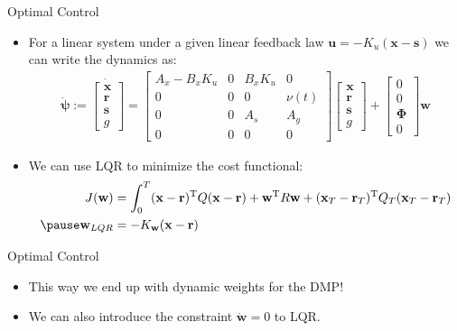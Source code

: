 \documentclass[handout]{beamer}
\newcommand{\fullvec}{\boldsymbol{\psi}} %
\newcommand{\basis}{\mathbf{\Phi}} %
\newcommand{\state}{\mathbf{x}} %
\newcommand{\traj}{\mathbf{r}} %
\newcommand{\dmp}{\mathbf{s}} %
\newcommand{\sysInput}{\mathbf{u}} %
\newcommand{\weights}{\mathbf{w}} %
\begin{document}
\begin{frame}{Optimal Control}
\begin{itemize}
\item For a linear system under a given linear feedback law $\sysInput = -K_u(\state - \dmp)$ we can write the dynamics as: \pause
\begin{equation*}
\begin{aligned}
 \dot{\fullvec} := \dot{
 \begin{bmatrix}
  \state \\
  \traj \\
  \dmp \\
  g
 \end{bmatrix}} = 
 \begin{bmatrix}
  A_x - B_xK_u & 0 & B_xK_u & 0 \\
  0 & 0 & 0 & \nu(t) \\
  0  & 0  & A_s & A_g  \\
  0 & 0 & 0 & 0
 \end{bmatrix}
 \begin{bmatrix}
   \state \\
   \traj \\
   \dmp \\
   g
  \end{bmatrix} +
  \begin{bmatrix}
    0 \\
    0 \\
    \basis \\
    0
   \end{bmatrix} \weights
\end{aligned}
\end{equation*}
\pause
\item We can use LQR to minimize the cost functional: \pause
\begin{equation*}
\begin{aligned}
J(\weights) &= \int_{0}^{T} (\state - \traj)^{\mathrm{T}}Q(\state - \traj) + \weights^{\mathrm{T}}R\weights + (\state_T-\traj_T)^{\mathrm{T}}Q_{T}(\state_T-\traj_T) \\ \pause
\weights_{LQR} &= -K_{\weights}(\state - \traj)
\end{aligned}
\end{equation*}
\end{itemize}
\end{frame}
%
\begin{frame}{Optimal Control}
\begin{itemize}
\item This way we end up with dynamic weights for the DMP! \pause
\item We can also introduce the constraint $\dot{\weights} = 0$ to LQR.
\end{itemize}
\end{frame}	
\end{document}
